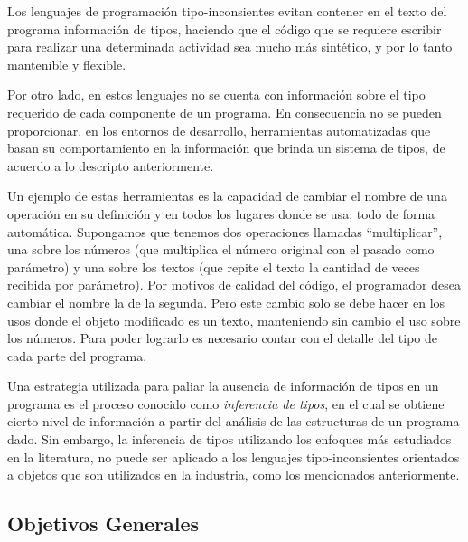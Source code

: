 \documentclass[a4paper,10pt]{article}
\begin{document}
Los lenguajes de programación tipo-inconsientes evitan contener en el texto del programa información de tipos, haciendo que el código que se requiere escribir para realizar una determinada actividad sea mucho más sintético, y por lo tanto mantenible y flexible. 

Por otro lado, en estos lenguajes no se cuenta con información sobre el tipo requerido de cada componente de un programa. En consecuencia no se pueden proporcionar, en los entornos de desarrollo, herramientas automatizadas que basan su comportamiento en la información que brinda un sistema de tipos, de acuerdo a lo descripto anteriormente.

Un ejemplo de estas herramientas es la capacidad de cambiar el nombre de una operación en su definición y en todos los lugares donde se usa; todo de forma automática. Supongamos que tenemos dos operaciones llamadas ``multiplicar'', una sobre los números (que multiplica el número original con el pasado como parámetro) y una sobre los textos (que repite el texto la cantidad de veces recibida por parámetro). Por motivos de calidad del código, el programador desea cambiar el nombre la de la segunda. Pero este cambio solo se debe hacer en los usos donde el objeto modificado es un texto, manteniendo sin cambio el uso sobre los números. Para poder lograrlo es necesario contar con el detalle del tipo de cada parte del programa. 

%

Una estrategia utilizada para paliar la ausencia de información de tipos en un programa es el proceso conocido como \emph{inferencia de tipos}\cite{Miln78a}, en el cual se obtiene cierto nivel de información a partir del análisis de las estructuras de un programa dado.
Sin embargo, la inferencia de tipos utilizando los enfoques más estudiados en la literatura, no puede ser aplicado a los lenguajes tipo-inconsientes orientados a objetos que son utilizados en la industria, como los mencionados anteriormente.



\subsection{Objetivos Generales}
\end{document}
